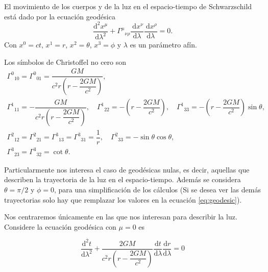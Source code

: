 \noindent El movimiento de los cuerpos y de la luz en el espacio-tiempo de Schwarzschild está dado por la ecuación geodésica
\begin{equation}
    \frac{\mathrm{d}^2 x^\mu}{\mathrm{d} \lambda^2}+\Gamma^\mu{ }_{\nu \rho} \frac{\mathrm{~d} x^\nu}{\mathrm{d} \lambda} \frac{\mathrm{~d} x^\rho}{\mathrm{d} \lambda}=0.
    \label{eq:geodesic}
\end{equation}
Con $x^0 = ct$, $x^1 = r$, $x^2 = \theta$, $x^3 = \phi$ y $\lambda$ es un parámetro afín.

Los símbolos de Christoffel no cero son
\begin{equation}
        \begin{array}{l}
        \Gamma^0{ }_{10}=\Gamma^0{ }_{01}=\dfrac{G M}{c^2 r\left(r - \dfrac{2 G M}{c^2}\right)},                                                                                                                       \\
        \Gamma^1{ }_{11}=-\dfrac{G M}{c^2 r\left(r - \dfrac{2 G M}{c^2}\right)}, \quad \Gamma^1{ }_{22}=-\left(r - \dfrac{2 G M}{c^2}\right), \quad \Gamma^1{ }_{33}=-\left(r - \dfrac{2 G M}{c^2}\right) \sin \theta, \\
        \Gamma^2{ }_{12}=\Gamma^2{ }_{21}=\Gamma^3{ }_{13}=\Gamma^3{ }_{31}=\dfrac{1}{r}, \quad \Gamma^2{ }_{33}=-\sin \theta \cos \theta,                                                                             \\
        \Gamma^3{ }_{23}=\Gamma^3{ }_{32}=\cot \theta.
    \end{array}
\end{equation}

Particularmente nos interesa el caso de geodésicas nulas, es decir, aquellas que describen la trayectoria de la luz en el espacio-tiempo. Además se considera $\theta=\pi/2$ y $\phi=0$, para una simplificación de los cálculos (Si se desea ver las demás trayectorias solo hay que remplazar los valores en la ecuación \ref{eq:geodesic}).

Nos centraremos únicamente en las que nos interesan para describir la luz. Considere  la ecuación geodésica con $\mu=0$ es

\begin{equation}    
    \frac{\mathrm{d}^2 t}{\mathrm{d} \lambda^2}+\dfrac{2 G M}{c^2 r\left(r - \dfrac{2 G M}{c^2}\right)} \frac{\mathrm{d} t}{\mathrm{d} \lambda} \frac{\mathrm{d} r}{\mathrm{d} \lambda}=0
\end{equation}

